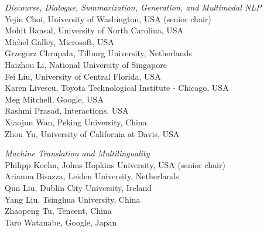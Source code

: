 \emph{Discourse, Dialogue, Summarization, Generation, and Multimodal NLP} \\
\hspace*{0.2in}Yejin Choi, University of Washington, USA (senior chair)\\
\hspace*{0.2in}Mohit Bansal, University of North Carolina, USA\\
\hspace*{0.2in}Michel Galley, Microsoft, USA\\
\hspace*{0.2in}Grzegorz Chrupa\l{}a, Tilburg University, Netherlands\\
\hspace*{0.2in}Haizhou Li, National University of Singapore\\
\hspace*{0.2in}Fei Liu, University of Central Florida, USA\\
\hspace*{0.2in}Karen Livescu, Toyota Technological Institute - Chicago, USA\\
\hspace*{0.2in}Meg Mitchell, Google, USA\\
\hspace*{0.2in}Rashmi Prasad, Interactions, USA\\
\hspace*{0.2in}Xiaojun Wan, Peking University, China\\
\hspace*{0.2in}Zhou Yu, University of California at Davis, USA

\emph{Machine Translation and Multilinguality} \\
\hspace*{0.2in}Philipp Koehn, Johns Hopkins University, USA (senior chair)\\
\hspace*{0.2in}Arianna Bisazza, Leiden University, Netherlands\\
\hspace*{0.2in}Qun Liu, Dublin City University, Ireland\\
\hspace*{0.2in}Yang Liu, Tsinghua University, China\\
\hspace*{0.2in}Zhaopeng Tu, Tencent, China\\
\hspace*{0.2in}Taro Watanabe, Google, Japan

